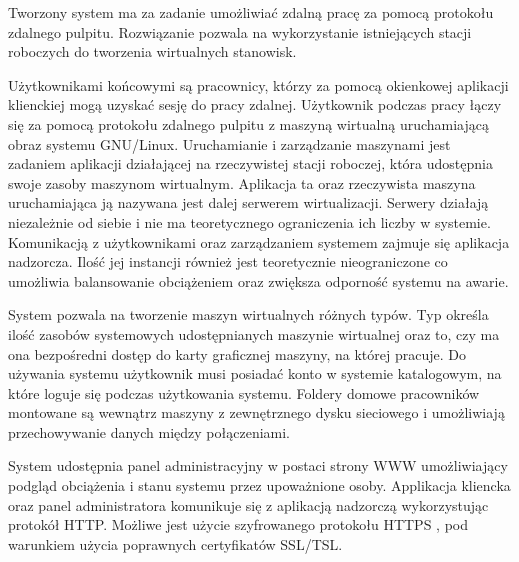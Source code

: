 \documentclass[../wstep.tex]{subfiles}
\begin{document}
Tworzony system ma za zadanie umożliwiać zdalną pracę za pomocą protokołu zdalnego pulpitu. Rozwiązanie pozwala na wykorzystanie istniejących stacji roboczych do tworzenia wirtualnych stanowisk.

Użytkownikami końcowymi są pracownicy, którzy za pomocą okienkowej aplikacji klienckiej mogą uzyskać sesję do pracy zdalnej. Użytkownik podczas pracy łączy się za pomocą protokołu zdalnego pulpitu z maszyną wirtualną uruchamiającą obraz systemu GNU/Linux. Uruchamianie i zarządzanie maszynami jest zadaniem aplikacji działającej na rzeczywistej stacji roboczej, która udostępnia swoje zasoby maszynom wirtualnym. Aplikacja ta oraz rzeczywista maszyna uruchamiająca ją nazywana jest dalej serwerem wirtualizacji. Serwery działają niezależnie od siebie i nie ma teoretycznego ograniczenia ich liczby w systemie. Komunikacją z użytkownikami oraz zarządzaniem systemem zajmuje się aplikacja nadzorcza. Ilość jej instancji również jest teoretycznie nieograniczone co umożliwia balansowanie obciążeniem oraz zwiększa odporność systemu na awarie.

System pozwala na tworzenie maszyn wirtualnych różnych typów. Typ określa ilość zasobów systemowych udostępnianych maszynie wirtualnej oraz to, czy ma ona bezpośredni dostęp do karty graficznej maszyny, na której pracuje. Do używania systemu użytkownik musi posiadać konto w systemie katalogowym, na które loguje się podczas użytkowania systemu. Foldery domowe pracowników montowane są wewnątrz maszyny z zewnętrznego dysku sieciowego i umożliwiają przechowywanie danych między połączeniami.

System udostępnia panel administracyjny w postaci strony WWW umożliwiający podgląd obciążenia i stanu systemu przez upoważnione osoby. Applikacja kliencka oraz panel administratora komunikuje się z aplikacją nadzorczą wykorzystując protokół HTTP. Możliwe jest użycie szyfrowanego protokołu HTTPS \parencite{rfc2818}, pod warunkiem użycia poprawnych certyfikatów SSL/TSL.
\end{document}
